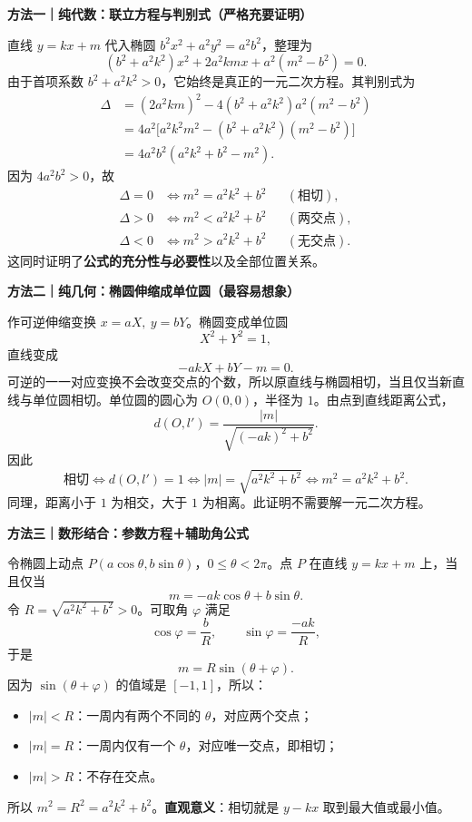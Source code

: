 \begin{proofbox}
\textbf{方法一｜纯代数：联立方程与判别式（严格充要证明）}\par
直线 $y=kx+m$ 代入椭圆 $b^2x^2+a^2y^2=a^2b^2$，整理为
\[
(b^2+a^2k^2)x^2+2a^2kmx+a^2(m^2-b^2)=0.
\]
由于首项系数 $b^2+a^2k^2>0$，它始终是真正的一元二次方程。其判别式为
\[
\begin{aligned}
\Delta
&=(2a^2km)^2-4(b^2+a^2k^2)a^2(m^2-b^2)\\
&=4a^2\Big[a^2k^2m^2-(b^2+a^2k^2)(m^2-b^2)\Big]\\
&=\boxed{4a^2b^2(a^2k^2+b^2-m^2)}.
\end{aligned}
\]
因为 $4a^2b^2>0$，故
\[
\begin{aligned}
\Delta=0&\iff m^2=a^2k^2+b^2 &&(\text{相切}),\\
\Delta>0&\iff m^2<a^2k^2+b^2 &&(\text{两交点}),\\
\Delta<0&\iff m^2>a^2k^2+b^2 &&(\text{无交点}).
\end{aligned}
\]
这同时证明了\textbf{公式的充分性与必要性}以及全部位置关系。

\medskip
\textbf{方法二｜纯几何：椭圆伸缩成单位圆（最容易想象）}\par
作可逆伸缩变换 $x=aX,\ y=bY$。椭圆变成单位圆
\[
X^2+Y^2=1,
\]
直线变成
\[
-akX+bY-m=0.
\]
可逆的一一对应变换不会改变交点的个数，所以原直线与椭圆相切，当且仅当新直线与单位圆相切。单位圆的圆心为 $O(0,0)$，半径为 $1$。由点到直线距离公式，
\[
d(O,l')=\frac{|m|}{\sqrt{(-ak)^2+b^2}}.
\]
因此
\[
\text{相切}\iff d(O,l')=1
\iff |m|=\sqrt{a^2k^2+b^2}
\iff \boxed{m^2=a^2k^2+b^2}.
\]
同理，距离小于 $1$ 为相交，大于 $1$ 为相离。此证明不需要解一元二次方程。

\medskip
\textbf{方法三｜数形结合：参数方程＋辅助角公式}\par
令椭圆上动点 $P(a\cos\theta,b\sin\theta)$，$0\le\theta<2\pi$。点 $P$ 在直线 $y=kx+m$ 上，当且仅当
\[
m=-ak\cos\theta+b\sin\theta.
\]
令 $R=\sqrt{a^2k^2+b^2}>0$。可取角 $\varphi$ 满足
\[
\cos\varphi=\frac{b}{R},\qquad
\sin\varphi=\frac{-ak}{R},
\]
于是
\[
m=R\sin(\theta+\varphi).
\]
因为 $\sin(\theta+\varphi)$ 的值域是 $[-1,1]$，所以：
\begin{itemize}
    \item $|m|<R$：一周内有两个不同的 $\theta$，对应两个交点；
    \item $|m|=R$：一周内仅有一个 $\theta$，对应唯一交点，即相切；
    \item $|m|>R$：不存在交点。
\end{itemize}
所以 $\boxed{m^2=R^2=a^2k^2+b^2}$。\textbf{直观意义}：相切就是 $y-kx$ 取到最大值或最小值。


\end{proofbox}
